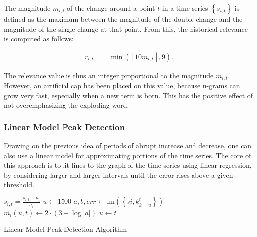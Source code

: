 The magnitude $m_{i, t}$ of the change around a point $t$ in a time series $\left\{ s_{i, t} \right\}$ is defined as the maximum between the magnitude of the double change and the magnitude of the single change at that point. From this, the historical relevance is computed as follows:

\begin{align}
\label{eq:double-change-relevance}
r_{i, t} &= \min \left( \left\lfloor 10 m_{i, t} \right\rfloor, 9 \right).
\end{align}

The relevance value is thus an integer proportional to the magnitude $m_{i, t}$. However, an artificial cap has been placed on this value, because n-grams can grow very fast, especially when a new term is born. This has the positive effect of not overemphasizing the exploding word.

\subsubsection{Linear Model Peak Detection}

Drawing on the previous idea of periods of abrupt increase and decrease, one can also use a linear model for approximating portions of the time series. The core of this approach is to fit lines to the graph of the time series using linear regression, by considering larger and larger intervals until the error rises above a given threshold.

\begin{algorithm}

\begin{algorithmic}[1]
        \State $s_{i, t} = \frac{s_{i, t} - \mu_i}{\sigma_i}$
    \EndFor
\EndFor
{}
    \State $u \gets 1500$
        \State $a, b, err \gets \textrm{lm} \left( \left\{ s{i, k}_{k = u}^t \right\} \right)$
            \State $m_i \left( u, t \right) \gets 2 \cdot \left( 3 + \log \left| a \right| \right)$
            \State $u \gets t$
        \EndIf
    \EndFor
\EndFor
\end{algorithmic}

\caption{Linear Model Peak Detection Algorithm}
\label{alg:linear-model}

\end{algorithm}

